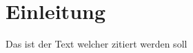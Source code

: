 \Author{\daAuthorOne}

\section{Einleitung}

Das ist der Text welcher zitiert werden soll \autocite{einstein}